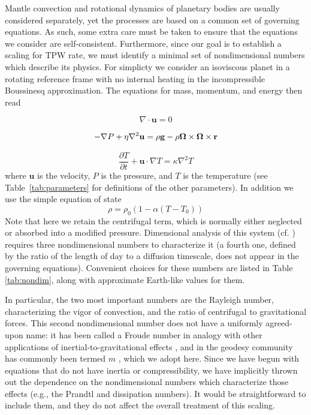 \documentclass[extra,mreferee]{gji}
\begin{document}
Mantle convection and rotational dynamics of planetary bodies are usually considered separately, yet the processes are based on a common set of governing equations. 
As such, some extra care must be taken to ensure that the equations we consider are self-consistent. 
Furthermore, since our goal is to establish a scaling for TPW rate, we must identify a minimal set of nondimensional numbers which describe its physics.
For simplicty we consider an isoviscous planet in a rotating reference frame with no internal heating in the incompressible Boussinesq approximation.  The equations for mass, momentum, and energy then read

\begin{equation}
\nabla \cdot \mathbf{u} = 0
\label{eq:conserve_mass}
\end{equation}

\begin{equation}
\begin{aligned}
- \nabla P + \eta \nabla^2 \mathbf{u} =  \rho \mathbf{g} -  \rho \mitbf{\Omega} \times \mitbf{\Omega} \times \mathbf{r}
\label{eq:navier_stokes}
\end{aligned}
\end{equation}

\begin{equation}
\frac{\partial T}{\partial t} + \mathbf{u} \cdot \nabla T = \kappa \nabla^2 T
\label{eq:energy}
\end{equation}
where $\mathbf{u}$ is the velocity, $P$ is the pressure, and $T$ is the temperature
(see Table~\ref{tab:parameters} for definitions of the other parameters).
In addition we use the simple equation of state
\begin{equation}
\rho = \rho_0 \left( 1 - \alpha (T-T_0) \right)
\label{eq:eos}
\end{equation}
Note that here we retain the centrifugal term, which is normally either neglected or absorbed into a modified pressure.
Dimensional analysis of this system (cf. \citet{barenblatt1996scaling}) requires three nondimensional numbers to characterize it
(a fourth one, defined by the ratio of the length of day to a diffusion timescale, does not appear in the governing equations).
Convenient choices for these numbers are listed in Table \ref{tab:nondim}, along with approximate Earth-like values for them.

In particular, the two most important numbers are the Rayleigh number, characterizing the vigor of convection, and the ratio of centrifugal to gravitational forces.
This second nondimensional number does not have a uniformly agreed-upon name: it has been called a Froude number in analogy with other applications of inertial-to-gravitational effects \citep{mckenzie1968influence}, 
and in the geodesy community has commonly been termed $m$ \citep[e.g.][]{nakiboglu1982hydrostatic, chambat2010flattening}, which we adopt here.
Since we have begun with equations that do not have inertia or compressibility, we have implicitly thrown out the dependence on the nondimensional numbers which characterize those effects (e.g., the Prandtl and dissipation numbers).
It would be straightforward to include them, and they do not affect the overall treatment of this scaling.
\end{document}
